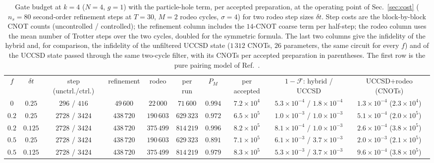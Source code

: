 \documentclass[
  aps,            %
  prc,            %
  reprint,        %
  superscriptaddress,
  floatfix,
  nofootinbib
]{revtex4-2}
\begin{document}
\begin{table}[t]
\caption{\label{tab:phdepth}Gate budget at $k=4$ ($N=4$, $g=1$) with the
particle-hole term, per accepted preparation, at the operating point of
Sec.~\ref{sec:cost} ($n_s=80$ second-order refinement steps at $T=30$, $M=2$
rodeo cycles, $\sigma=4$) for two rodeo step sizes $\delta t$.  Step costs are
the block-by-block CNOT counts (uncontrolled / controlled); the refinement
column includes the $14$-CNOT coarse term per half-step; the rodeo column uses
the mean number of Trotter steps over the two cycles, doubled for the symmetric
formula.  The last two columns give the infidelity of the hybrid and, for
comparison, the infidelity of the unfiltered UCCSD state ($1\,312$ CNOTs,
$26$ parameters, the same circuit for every $f$) and of the UCCSD state passed
through the same two-cycle filter, with its CNOTs per accepted preparation in
parentheses.  The first row is the pure pairing model of
Ref.~\cite{PairingCompanion}.}
\footnotesize
\begin{ruledtabular}
\begin{tabular}{cccccccc cc}
$f$ & $\delta t$ & step (unctrl./ctrl.) & refinement & rodeo & per run & $P_M$ & per accepted & $1-\mathcal{F}$: hybrid / UCCSD & UCCSD$+$rodeo (CNOTs)\\
\colrule
$0$   & $0.25$  & $296$ / $416$   & $49\,600$  & $22\,000$ & $71\,600$ & $0.994$ & $7.2\times10^{4}$ & $5.3\times10^{-4}$ / $1.8\times10^{-4}$ & $1.3\times10^{-4}$ ($2.3\times10^{4}$)\\
$0.2$ & $0.25$  & $2728$ / $3424$ & $438\,720$ & $190\,603$ & $629\,323$ & $0.972$ & $6.5\times10^{5}$ & $1.0\times10^{-3}$ / $1.0\times10^{-3}$ & $5.1\times10^{-4}$ ($2.0\times10^{5}$)\\
$0.2$ & $0.125$ & $2728$ / $3424$ & $438\,720$ & $375\,499$ & $814\,219$ & $0.996$ & $8.2\times10^{5}$ & $8.1\times10^{-4}$ / $1.0\times10^{-3}$ & $2.6\times10^{-4}$ ($3.8\times10^{5}$)\\
$0.5$ & $0.25$  & $2728$ / $3424$ & $438\,720$ & $190\,603$ & $629\,323$ & $0.891$ & $7.1\times10^{5}$ & $6.1\times10^{-3}$ / $3.7\times10^{-3}$ & $2.0\times10^{-3}$ ($2.1\times10^{5}$)\\
$0.5$ & $0.125$ & $2728$ / $3424$ & $438\,720$ & $375\,499$ & $814\,219$ & $0.979$ & $8.3\times10^{5}$ & $5.3\times10^{-3}$ / $3.7\times10^{-3}$ & $9.6\times10^{-4}$ ($3.8\times10^{5}$)\\
\end{tabular}
\end{ruledtabular}
\end{table}
\end{document}
